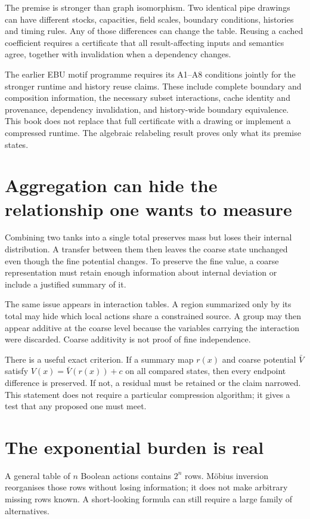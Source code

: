 The premise is stronger than graph isomorphism. Two identical pipe drawings can have different stocks, capacities, field scales, boundary conditions, histories and timing rules. Any of those differences can change the table. Reusing a cached coefficient requires a certificate that all result-affecting inputs and semantics agree, together with invalidation when a dependency changes.

The earlier EBU motif programme requires its A1--A8 conditions jointly for the stronger runtime and history reuse claims. These include complete boundary and composition information, the necessary subset interactions, cache identity and provenance, dependency invalidation, and history-wide boundary equivalence. This book does not replace that full certificate with a drawing or implement a compressed runtime. The algebraic relabeling result proves only what its premise states.

\section{Aggregation can hide the relationship one wants to measure}
Combining two tanks into a single total preserves mass but loses their internal distribution. A transfer between them then leaves the coarse state unchanged even though the fine potential changes. To preserve the fine value, a coarse representation must retain enough information about internal deviation or include a justified summary of it.

The same issue appears in interaction tables. A region summarized only by its total may hide which local actions share a constrained source. A group may then appear additive at the coarse level because the variables carrying the interaction were discarded. Coarse additivity is not proof of fine independence.

There is a useful exact criterion. If a summary map $r(x)$ and coarse potential $\bar V$ satisfy $V(x)=\bar V(r(x))+c$ on all compared states, then every endpoint difference is preserved. If not, a residual must be retained or the claim narrowed. This statement does not require a particular compression algorithm; it gives a test that any proposed one must meet.

\section{The exponential burden is real}
A general table of $n$ Boolean actions contains $2^n$ rows. Möbius inversion reorganises those rows without losing information; it does not make arbitrary missing rows known. A short-looking formula can still require a large family of alternatives.

